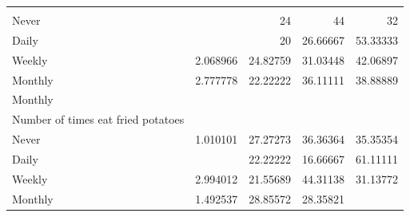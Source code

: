 \documentclass{article}
\begin{document}
\begin{table}[!h]
{\begin{tabular}{lllll}
			\multicolumn{1}{|r}{} &
			\multicolumn{1}{r}{} &
			\multicolumn{1}{r}{} &
			\multicolumn{1}{r}{} \\
			\multicolumn{1}{l}{\hspace{5em}Never} &
			\multicolumn{1}{|r}{} &
			\multicolumn{1}{r}{24} &
			\multicolumn{1}{r}{44} &
			\multicolumn{1}{r}{32} \\
			\multicolumn{1}{l}{\hspace{5em}Daily} &
			\multicolumn{1}{|r}{} &
			\multicolumn{1}{r}{20} &
			\multicolumn{1}{r}{26.66667} &
			\multicolumn{1}{r}{53.33333} \\
			\multicolumn{1}{l}{\hspace{5em}Weekly} &
			\multicolumn{1}{|r}{2.068966} &
			\multicolumn{1}{r}{24.82759} &
			\multicolumn{1}{r}{31.03448} &
			\multicolumn{1}{r}{42.06897} \\
			\multicolumn{1}{l}{\hspace{5em}Monthly} &
			\multicolumn{1}{|r}{2.777778} &
			\multicolumn{1}{r}{22.22222} &
			\multicolumn{1}{r}{36.11111} &
			\multicolumn{1}{r}{38.88889} \\
			\multicolumn{1}{l}{\hspace{3em}Monthly} &
			\multicolumn{1}{|r}{} &
			\multicolumn{1}{r}{} &
			\multicolumn{1}{r}{} &
			\multicolumn{1}{r}{} \\
			\multicolumn{1}{l}{\hspace{4em}Number of times eat fried potatoes} &
			\multicolumn{1}{|r}{} &
			\multicolumn{1}{r}{} &
			\multicolumn{1}{r}{} &
			\multicolumn{1}{r}{} \\
			\multicolumn{1}{l}{\hspace{5em}Never} &
			\multicolumn{1}{|r}{1.010101} &
			\multicolumn{1}{r}{27.27273} &
			\multicolumn{1}{r}{36.36364} &
			\multicolumn{1}{r}{35.35354} \\
			\multicolumn{1}{l}{\hspace{5em}Daily} &
			\multicolumn{1}{|r}{} &
			\multicolumn{1}{r}{22.22222} &
			\multicolumn{1}{r}{16.66667} &
			\multicolumn{1}{r}{61.11111} \\
			\multicolumn{1}{l}{\hspace{5em}Weekly} &
			\multicolumn{1}{|r}{2.994012} &
			\multicolumn{1}{r}{21.55689} &
			\multicolumn{1}{r}{44.31138} &
			\multicolumn{1}{r}{31.13772} \\
			\multicolumn{1}{l}{\hspace{5em}Monthly} &
			\multicolumn{1}{|r}{1.492537} &
			\multicolumn{1}{r}{28.85572} &
			\multicolumn{1}{r}{28.35821} &

\end{tabular}}
\end{table}
\end{document}
